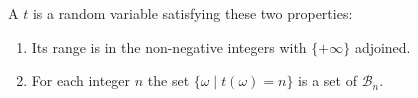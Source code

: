 A  $t$ is a random variable satisfying these two properties:
\begin{enumerate}
\item Its range is in the non-negative integers with $\{+\infty\}$ adjoined.
\item For each integer $n$ the set $\{\omega \mid t(\omega) = n\}$ is a set of $\mathcal{B}_n$.
\end{enumerate}
